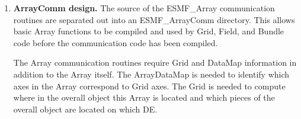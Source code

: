 \begin{enumerate}
\item{\bf ArrayComm design.}
The source of the ESMF\_Array communication routines are separated out into 
an ESMF\_ArrayComm directory.  This allows basic Array functions to be
compiled and used by Grid, Field, and Bundle code before the communication
code has been compiled.  

The Array communication routines require Grid and DataMap information in 
addition to the Array itself.   The ArrayDataMap is needed to identify which
axes in the Array correspond to Grid axes.  The Grid is needed to compute
where in the overall object this Array is located and which pieces of
the overall object are located on which DE.


\end{enumerate}





